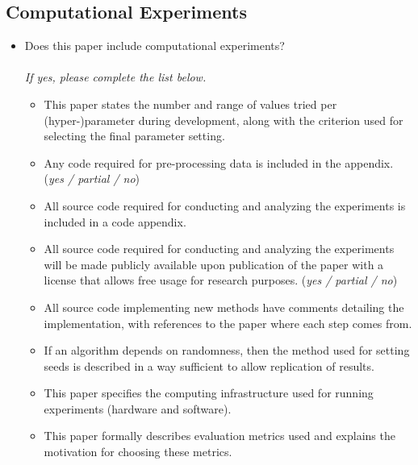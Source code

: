 \documentclass[letterpaper]{article} %
\begin{document}
\subsection*{Computational Experiments}
\begin{itemize}
    \item Does this paper include computational experiments? \\  \\
    \textit{If yes, please complete the list below.}
    \begin{itemize}
        \item This paper states the number and range of values tried per (hyper-)parameter during development, along with the criterion used for selecting the final parameter setting. \\ 
        \item Any code required for pre-processing data is included in the appendix. \hfill (\textit{yes / partial / no})
        \item All source code required for conducting and analyzing the experiments is included in a code appendix. \\ 
        \item All source code required for conducting and analyzing the experiments will be made publicly available upon publication of the paper with a license that allows free usage for research purposes. \hfill (\textit{yes / partial / no})
        \item All source code implementing new methods have comments detailing the implementation, with references to the paper where each step comes from. \\ 
        \item If an algorithm depends on randomness, then the method used for setting seeds is described in a way sufficient to allow replication of results. \\ 
        \item This paper specifies the computing infrastructure used for running experiments (hardware and software). \\ 
        \item This paper formally describes evaluation metrics used and explains the motivation for choosing these metrics. \\ 

\end{itemize}
\end{itemize}
\end{document}
